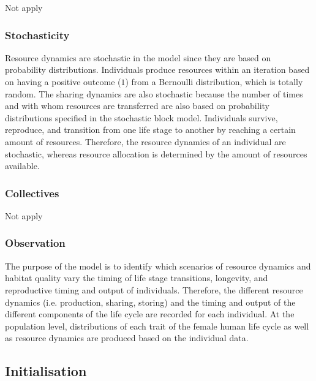 \documentclass{article}
\begin{document}
Not apply

\subsubsection{Stochasticity}

Resource dynamics are stochastic in the model since they are based on probability distributions. Individuals produce resources within an iteration based on having a positive outcome ($1$) from a Bernoulli distribution, which is totally random. The sharing dynamics are also stochastic because the number of times and with whom resources are transferred are also based on probability distributions specified in the stochastic block model. Individuals survive, reproduce, and transition from one life stage to another by reaching a certain amount of resources. Therefore, the resource dynamics of an individual are stochastic, whereas resource allocation is determined by the amount of resources available.

\subsubsection{Collectives}

Not apply

\subsubsection{Observation}

The purpose of the model is to identify which scenarios of resource dynamics and habitat quality vary the timing of life stage transitions, longevity, and reproductive timing and output of individuals. Therefore, the different resource dynamics (i.e. production, sharing, storing) and the timing and output of the different components of the life cycle are recorded for each individual. At the population level, distributions of each trait of the female human life cycle as well as resource dynamics are produced based on the individual data.

\subsection{Initialisation}
\end{document}
